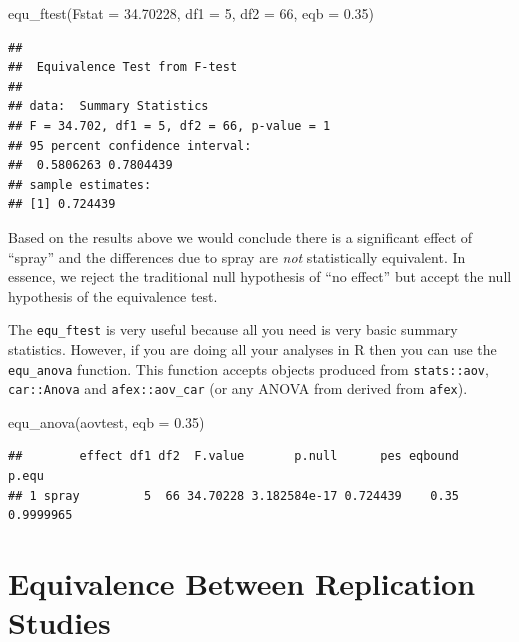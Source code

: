 \documentclass[]{interact}
\theoremstyle{plain}%
\theoremstyle{definition}
\theoremstyle{remark}
\newenvironment{Shaded}{\begin{snugshade}}{\end{snugshade}}
\newcommand{\AttributeTok}[1]{\textcolor[rgb]{0.77,0.63,0.00}{#1}}
\newcommand{\DecValTok}[1]{\textcolor[rgb]{0.00,0.00,0.81}{#1}}
\newcommand{\FloatTok}[1]{\textcolor[rgb]{0.00,0.00,0.81}{#1}}
\newcommand{\FunctionTok}[1]{\textcolor[rgb]{0.00,0.00,0.00}{#1}}
\newcommand{\NormalTok}[1]{#1}
\begin{document}
\begin{Shaded}
\begin{Highlighting}[]
\FunctionTok{equ\_ftest}\NormalTok{(}\AttributeTok{Fstat =} \FloatTok{34.70228}\NormalTok{,}
          \AttributeTok{df1 =} \DecValTok{5}\NormalTok{,}
          \AttributeTok{df2 =} \DecValTok{66}\NormalTok{,}
          \AttributeTok{eqb =} \FloatTok{0.35}\NormalTok{)}
\end{Highlighting}
\end{Shaded}

\begin{verbatim}
## 
##  Equivalence Test from F-test
## 
## data:  Summary Statistics
## F = 34.702, df1 = 5, df2 = 66, p-value = 1
## 95 percent confidence interval:
##  0.5806263 0.7804439
## sample estimates:
## [1] 0.724439
\end{verbatim}

Based on the results above we would conclude there is a significant
effect of ``spray'' and the differences due to spray are \emph{not}
statistically equivalent. In essence, we reject the traditional null
hypothesis of ``no effect'' but accept the null hypothesis of the
equivalence test.

The \texttt{equ\_ftest} is very useful because all you need is very
basic summary statistics. However, if you are doing all your analyses in
R then you can use the \texttt{equ\_anova} function. This function
accepts objects produced from \texttt{stats::aov}, \texttt{car::Anova}
and \texttt{afex::aov\_car} (or any ANOVA from derived from
\texttt{afex}).

\begin{Shaded}
\begin{Highlighting}[]
\FunctionTok{equ\_anova}\NormalTok{(aovtest,}
          \AttributeTok{eqb =} \FloatTok{0.35}\NormalTok{)}
\end{Highlighting}
\end{Shaded}

\begin{verbatim}
##        effect df1 df2  F.value       p.null      pes eqbound     p.equ
## 1 spray         5  66 34.70228 3.182584e-17 0.724439    0.35 0.9999965
\end{verbatim}

\newpage

\hypertarget{equivalence-between-replication-studies}{%
\section{Equivalence Between Replication
Studies}\label{equivalence-between-replication-studies}}
\end{document}

